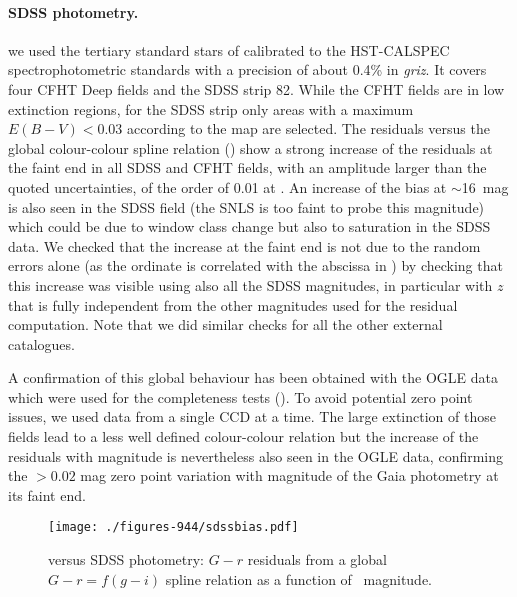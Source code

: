 \paragraph{SDSS photometry.}  we used  the tertiary standard stars of \cite{Betoule13} calibrated to the HST-CALSPEC spectrophotometric standards with a precision of about 0.4\% in {\it griz}. It covers four CFHT Deep fields and the SDSS strip 82. While the CFHT fields are in low extinction regions, for the SDSS strip only areas with a maximum $E(B-V)<0.03$ according to the \cite{Schlegel98} map are selected.
The residuals versus the global colour-colour spline relation () show a strong increase of the residuals at the faint end in all SDSS and CFHT fields, with an amplitude larger than the quoted uncertainties, of the order of 0.01 at . An increase of the bias at $\sim$16~mag is also seen in the SDSS field (the SNLS is too faint to probe this magnitude) which could be due to window class change but also to saturation in the SDSS data. 
We checked that the increase at the faint end is not due to the random errors alone (as the ordinate is correlated with the abscissa in ) by checking that this increase was visible using also all the SDSS magnitudes, in particular with $z$ that is fully independent from the other magnitudes used for the residual computation. Note that we did similar checks for all the other external catalogues.

A confirmation of this global behaviour has been obtained with the OGLE data which were used for the completeness tests (). To avoid potential zero point issues, we used data from a single CCD at a time. The large extinction of those fields lead to a less well defined colour-colour relation but the increase of the residuals with magnitude is nevertheless also seen in the OGLE data, confirming the $> 0.02$ mag zero point variation with magnitude of the Gaia photometry at its faint end. %

\begin{figure}
 \begin{center}
\texttt{[image: ./figures-944/sdssbias.pdf]} 
\end{center}
\caption[Gaia versus SDSS photometry]{{} versus SDSS photometry: %
$G-r$ residuals from a global $G-r=f(g-i)$ spline relation as a function of \gmag~magnitude.
}
\label{fig:wp944_sdssphot}
\end{figure}

